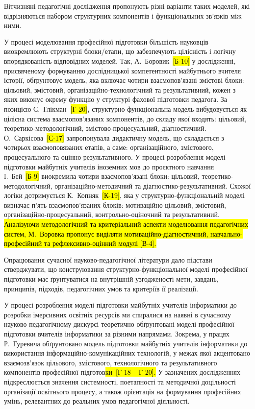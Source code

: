 Вітчизняні педагогічні дослідження пропонують різні варіанти таких моделей, які відрізняються набором структурних компонентів і функціональних зв'язків між ними.

У процесі моделювання професійної підготовки більшість науковців виокремлюють структурні блоки/етапи, що забезпечують цілісність і логічну впорядкованість відповідних моделей. Так, А.~Боровик~\hl{{[}Б-10{]}} у дослідженні, присвяченому формуванню дослідницької компетентності майбутнього вчителя історії, обґрунтовує модель, яка включає чотири взаємопов'язані змістові блоки: цільовий, змістовий, організаційно-технологічний та результативний, кожен з яких виконує окрему функцію у структурі фахової підготовки педагога. За позицією С.~Глікман\textbf{~}\hl{{[}Г-20{]}}\textbf{,} структурно-функціональна модель вибудовується як цілісна система взаємопов'язаних компонентів, до складу якої входять: цільовий, теоретико-методологічний, змістово-процесуальний, діагностичний\emph{.} О.~Саркісова~\hl{{[}С-17{]}} запропонувала дидактичну модель, що складається з чотирьох взаємопов\textquotesingle язаних етапів, а саме: організаційного, змістового, процесуального та оцінно-результативного. У процесі розроблення моделі підготовки майбутніх учителів іноземних мов до проєктного навчання І.~Бей~\hl{{[}Б-9{]}} виокремила чотири взаємопов'язані блоки: цільовий, теоретико-методологічний, організаційно-методичний та діагностико-результативний. Схожої логіки дотримується К.~Копняк~\hl{{[}К-19{]}}, яка у структурно-функціональній моделі визначає п'ять взаємопов'язаних блоків: мотиваційно-цільовий, змістовий, організаційно-процесуальний, контрольно-оціночний та результативний. \hl{Аналізуючи методологічний та критеріальний аспекти моделювання педагогічних систем, М.~Воровка пропонує виділяти мотиваційно-діагностичний, навчально-професійний та рефлексивно-оцінний модулі {[}В-4{]}.}

Опрацювання сучасної науково-педагогічної літератури дало підстави стверджувати, що конструювання структурно-функціональної моделі професійної підготовки має ґрунтуватися на внутрішній узгодженості мети, завдань, принципів, підходів, педагогічних умов та критеріїв її реалізації.

У процесі розроблення моделі підготовки майбутніх учителів інформатики до розробки імерсивних освітніх ресурсів ми спиралися на наявні в сучасному науково-педагогічному дискурсі теоретично обґрунтовані моделі професійної підготовки вчителів інформатики за різними напрямами. Зокрема, у працях Р.~Гуревича обґрунтовано модель підготовки майбутніх учителів інформатики до використання інформаційно-комунікаційних технологій, у межах якої акцентовано взаємозв'язок цільового, змістового, технологічного та результативного компонентів професійної підготов\hl{ки~{[}Г-18 -- Г-20{]}.} У зазначених дослідженнях підкреслюється значення системності, поетапності та методичної доцільності організації освітнього процесу, а також орієнтація на формування професійних умінь, релевантних до реальних умов педагогічної діяльності.

